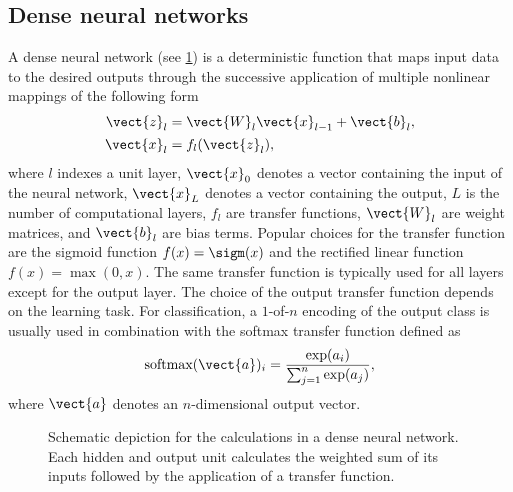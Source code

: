 \subsection{Dense neural networks}
\label{sec:DNN}

A dense neural network (see \ref{fig:dnn}) is a deterministic function that maps
input data to the desired outputs through the successive application of multiple
nonlinear mappings of the following form
\begin{align}
\vect{z}_l &= \vect{W}_l\vect{x}_{l-1} + \vect{b}_l, \\
\vect{x}_l &= f_l(\vect{z}_l),
\end{align}
where $l$ indexes a unit layer, $\vect{x}_0$ denotes a vector containing the
input of the neural network, $\vect{x}_L$ denotes a vector containing the
output, $L$ is the number of computational layers, $f_l$ are transfer functions,
$\vect{W}_l$ are weight matrices, and $\vect{b}_l$ are bias terms.
Popular choices for the transfer function are the sigmoid function $f(x) =
\sigm(x)$ and the rectified linear function $f(x) = \max(0, x)$. The same
transfer function is typically used for all layers except for the output layer.
The choice of the output transfer function depends on the learning task. For
classification, a $1$-of-$n$ encoding of the output class is usually used in
combination with the softmax transfer function defined as
\begin{equation}
\text{softmax}(\vect{a})_i = \frac{\exp(a_i)}{\sum_{j=1}^n \exp(a_j)},
\end{equation}
where $\vect{a}$ denotes an $n$-dimensional output vector.

\begin{figure}
\centering

\caption{Schematic depiction for the calculations in a dense neural network.
Each hidden and output unit calculates the weighted sum of its inputs followed
by the application of a transfer function.}
\label{fig:dnn}
\end{figure}

